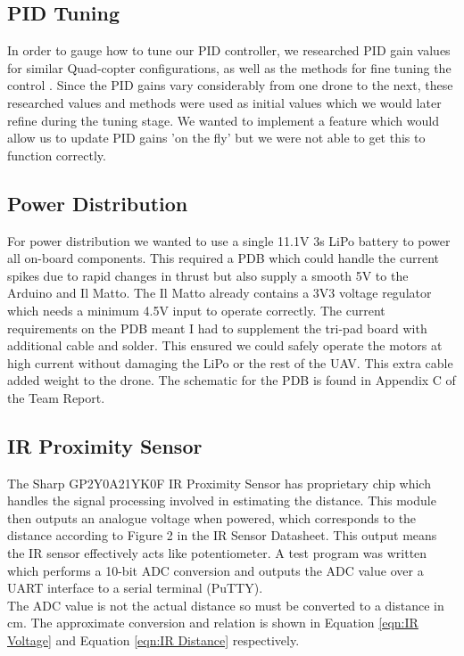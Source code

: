\documentclass[a4paper,11pt]{article}
\begin{document}
\subsection{PID Tuning}
In order to gauge how to tune our PID controller, we researched PID gain values for similar Quad-copter configurations, as well as the methods for fine tuning the control \cite{PID tuning guide}\cite{Quadcopter Control Theory}. Since the PID gains vary considerably from one drone to the next, these researched values and methods were used as initial values which we would later refine during the tuning stage. We wanted to implement a feature which would allow us to update PID gains 'on the fly' but we were not able to get this to function correctly.

\subsection{Power Distribution}
For power distribution we wanted to use a single 11.1V 3s LiPo battery to power all on-board components. This required a PDB which could handle the current spikes due to rapid changes in thrust but also supply a smooth 5V to the Arduino and Il Matto. The Il Matto already contains a 3V3 voltage regulator which needs a minimum 4.5V input to operate correctly. The current requirements on the PDB meant I had to supplement the tri-pad board with additional cable and solder. This ensured we could safely operate the motors at high current without damaging the LiPo or the rest of the UAV. This extra cable added weight to the drone. The schematic for the PDB is found in Appendix C of the Team Report.

\subsection{IR Proximity Sensor}
The Sharp GP2Y0A21YK0F IR Proximity Sensor has proprietary chip which handles the signal processing involved in estimating the distance. This module then outputs an analogue voltage when powered, which corresponds to the distance according to Figure 2 in the IR Sensor Datasheet\cite{IR Sensor Datasheet}. This output means the IR sensor effectively acts like potentiometer. A test program was written which performs a 10-bit ADC conversion and outputs the ADC value over a UART interface to a serial terminal (PuTTY).\\ The ADC value is not the actual distance so must be converted to a distance in cm. The approximate conversion and relation is shown in Equation \ref{eqn:IR Voltage} and Equation \ref{eqn:IR Distance} respectively.
\end{document}
